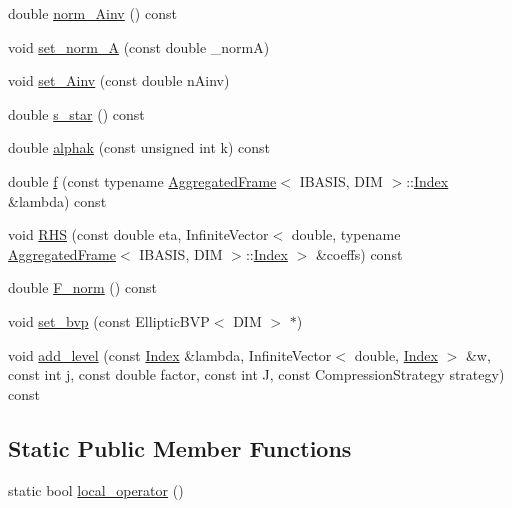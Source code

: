 \begin{CompactItemize}
double \hyperlink{classFrameTL_1_1EllipticEquation_dac74894c3281ab4384e9333792726fc}{norm\_\-Ainv} () const 
\item 
void \hyperlink{classFrameTL_1_1EllipticEquation_324bc7e2d2cc5a9e51fa6da305dae04b}{set\_\-norm\_\-A} (const double \_\-normA)
\item 
void \hyperlink{classFrameTL_1_1EllipticEquation_556d174fe601791cb7b33264c7e7c4ec}{set\_\-Ainv} (const double nAinv)
\item 
double \hyperlink{classFrameTL_1_1EllipticEquation_49aa28d722e5828e9ddf9d1bd57bff78}{s\_\-star} () const 
\item 
double \hyperlink{classFrameTL_1_1EllipticEquation_0ec35809bbfccc2dfff23d6efbee6a92}{alphak} (const unsigned int k) const 
\item 
double \hyperlink{classFrameTL_1_1EllipticEquation_cf749ff770cf529266c1272bca4bc184}{f} (const typename \hyperlink{classFrameTL_1_1AggregatedFrame}{AggregatedFrame}$<$ IBASIS, DIM $>$::\hyperlink{classFrameTL_1_1FrameIndex}{Index} \&lambda) const 
\item 
void \hyperlink{classFrameTL_1_1EllipticEquation_b0efc4d40ed2a12db9c8af7d195b210b}{RHS} (const double eta, InfiniteVector$<$ double, typename \hyperlink{classFrameTL_1_1AggregatedFrame}{AggregatedFrame}$<$ IBASIS, DIM $>$::\hyperlink{classFrameTL_1_1FrameIndex}{Index} $>$ \&coeffs) const 
\item 
double \hyperlink{classFrameTL_1_1EllipticEquation_1c6e0bd3bc27368aca7ea68c7baee8a1}{F\_\-norm} () const 
\item 
void \hyperlink{classFrameTL_1_1EllipticEquation_c7183c7aeb7e3c34cddf3c3e9a79b96c}{set\_\-bvp} (const EllipticBVP$<$ DIM $>$ $\ast$)
\item 
void \hyperlink{classFrameTL_1_1EllipticEquation_79b1544139e7bb5672f1af5c84a238bc}{add\_\-level} (const \hyperlink{classFrameTL_1_1FrameIndex}{Index} \&lambda, InfiniteVector$<$ double, \hyperlink{classFrameTL_1_1FrameIndex}{Index} $>$ \&w, const int j, const double factor, const int J, const CompressionStrategy strategy) const 
\end{CompactItemize}
\subsection*{Static Public Member Functions}
\begin{CompactItemize}
\item 
static bool \hyperlink{classFrameTL_1_1EllipticEquation_ca8c08093d2faeac98f8cfae67468f36}{local\_\-operator} ()
\end{CompactItemize}
